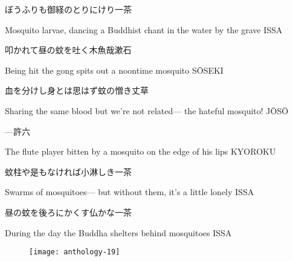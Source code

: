 \begin{haiku}
    {\FH ぼうふりも御経のとりにけり}\hfill{\FH 一茶}

    \vin{} Mosquito larvae,
    \vin{} \vin{} dancing a Buddhist chant
    \vin{} \vin{} \vin{} in the water by the grave \hspace{\fill} ISSA
\end{haiku}

\begin{haiku}
    {\FH 叩かれて昼の蚊を吐く木魚哉}\hfill{\FH 漱石}

    \vin{} Being hit
    \vin{} \vin{} the gong spits out
    \vin{} \vin{} \vin{} a noontime mosquito \hspace{\fill} S\={O}SEKI
\end{haiku}

\begin{haiku}
    {\FH 血を分けし身とは思はず蚊の憎き}\hfill{\FH 丈草}

    \vin{} Sharing the same blood
    \vin{} \vin{} but we're not related---
    \vin{} \vin{} \vin{} the hateful mosquito! \hspace{\fill} J\={O}S\={O}
\end{haiku}

\begin{haiku}
    {---}\hfill{\FH 許六}

    \vin{} The flute player
    \vin{} \vin{} bitten by a mosquito
    \vin{} \vin{} \vin{} on the edge of his lips \hspace{\fill} KYOROKU
\end{haiku}

\begin{haiku}
    {\FH 蚊柱や是もなければ小淋しき}\hfill{\FH 一茶}

    \vin{} Swarms of mosquitoes---
    \vin{} \vin{} but without them,
    \vin{} \vin{} \vin{} it's a little lonely \hspace{\fill} ISSA
\end{haiku}

\begin{haiku}
    {\FH 昼の蚊を後ろにかくす仏かな}\hfill{\FH 一茶}

    \vin{} During the day
    \vin{} \vin{} the Buddha shelters behind
    \vin{} \vin{} \vin{} mosquitoes \hspace{\fill} ISSA
\end{haiku}

\begin{figure}
    \texttt{[image: anthology-19]}
\end{figure}

